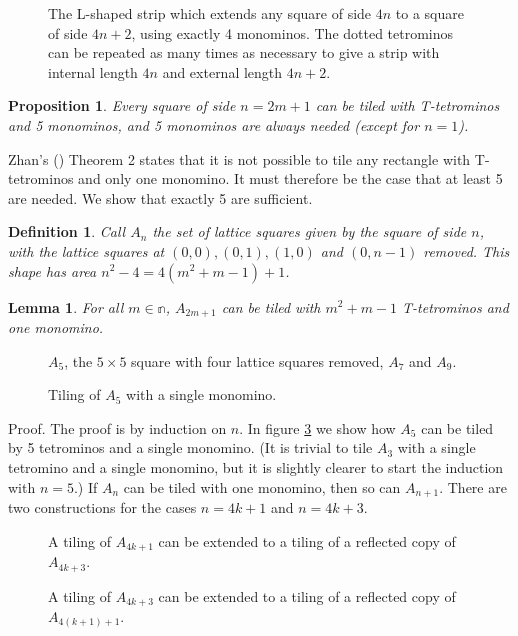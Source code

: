 \documentclass{article}
\theoremstyle{plain}
\newtheorem{proposition}[theorem]{Proposition}
\newtheorem{lemma}[theorem]{Lemma}
\newtheorem{definition}[theorem]{Definition}
\begin{document}
\begin{figure}

\caption{The L-shaped strip which extends any square of side $4n$ to a square of side $4n+2$, using exactly 4 monominos. The dotted tetrominos can be repeated as many times as necessary to give a strip with internal length $4n$ and external length $4n + 2$.}
\label{lshaped}
\end{figure}

\begin{proposition}\label{odd}
Every square of side $n = 2m + 1$ can be tiled with T-tetrominos and 5 monominos, and 5 monominos are always needed (except for $n = 1$).
\end{proposition}
Zhan's (\cite{zhan}) Theorem 2 states that it is not possible to tile any rectangle with T-tetrominos and only one monomino. It must therefore be the case that at least 5 are needed. We show that exactly 5 are sufficient.

\begin{definition}
Call $A_n$ the set of lattice squares given by the square of side $n$, with the lattice squares at $(0, 0), (0,1), (1, 0)$ and $(0, n-1)$ removed.
This shape has area $n^2 - 4 = 4(m^2 + m - 1) + 1$.
\end{definition}

\begin{lemma}
For all $m \in \mathbb{n}$, $A_{2m+1}$ can be tiled with $m^2 + m - 1$ T-tetrominos and one monomino.
\end{lemma}

\begin{figure}

\caption{$A_5$, the $5 \times 5$ square with four lattice squares removed, $A_7$ and $A_9$.}
\label{cropped}
\end{figure}

\begin{figure}

\caption{Tiling of $A_5$ with a single monomino.}
\label{five}
\end{figure}

{\sc Proof.}
The proof is by induction on $n$. In figure \ref{five} we show how $A_5$ can be tiled by 5 tetrominos and a single monomino. (It is trivial to tile $A_3$ with a single tetromino and a single monomino, but it is slightly clearer to start the induction with $n=5$.) If $A_n$ can be tiled with one monomino, then so can $A_{n+1}$. There are two constructions for the cases $n=4k+1$ and $n=4k+3$.

\begin{figure}

\caption{A tiling of $A_{4k+1}$ can be extended to a tiling of a reflected copy of $A_{4k+3}$.}
\label{ones}
\end{figure}

\begin{figure}

\caption{A tiling of $A_{4k+3}$ can be extended to a tiling of a reflected copy of $A_{4(k+1)+1}$.}
\label{threes}
\end{figure}

{}

\end{document}
